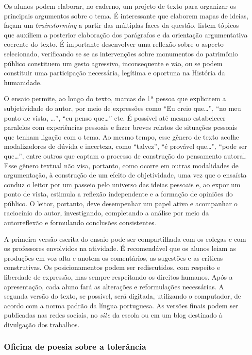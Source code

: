 \documentclass[11pt]{extarticle}
\begin{document}
Os alunos podem elaborar, no caderno, um projeto de texto para organizar
os principais argumentos sobre o tema. É interessante que elaborem mapas
de ideias, façam um \emph{brainstorming} a partir das múltiplas faces da
questão, listem tópicos que auxiliem a posterior elaboração dos
parágrafos e da orientação argumentativa coerente do texto. É importante
desenvolver uma reflexão sobre o aspecto selecionado, verificando se se
as intervenções sobre monumentos do patrimônio público constituem um
gesto agressivo, inconsequente e vão, ou se podem constituir uma
participação necessária, legítima e oportuna na História da humanidade.

O ensaio permite, ao longo do texto, marcas de 1ª pessoa que explicitem
a subjetividade do autor, por meio de expressões como ``Eu creio
que\ldots{}'', ``no meu ponto de vista, \ldots{}'', ``eu penso que\ldots{}'' etc. É
possível até mesmo estabelecer paralelos com experiências pessoais e
fazer breves relatos de situações pessoais que tenham ligação com o
tema. Ao mesmo tempo, esse gênero de texto acolhe modalizadores de
dúvida e incerteza, como ``talvez'', ``é provável que\ldots{}'', ``pode ser
que\ldots{}'', entre outros que captam o processo de construção do pensamento
autoral. Esse gênero textual não visa, portanto, como ocorre em outras
modalidades de argumentação, à construção de um efeito de objetividade,
uma vez que o ensaísta conduz o leitor por um passeio pelo universo das
ideias pessoais e, ao expor um ponto de vista, estimula a reflexão
independente e a formação de opiniões do público. O leitor, portanto,
deve desempenhar um papel ativo e acompanhar o raciocínio do autor,
investigando, completando a análise por meio da autorreflexão e
formulando conclusões consistentes.

A primeira versão escrita do ensaio pode ser compartilhada com os
colegas e com os professores envolvidos na atividade. É recomendável que
os alunos leiam as produções em voz alta e anotem os comentários, as
sugestões e as críticas construtivas. Os posicionamentos podem ser
rediscutidos, com respeito e liberdade de expressão, mas sempre
respeitando os direitos humanos. Após a apresentação, cada aluno fará as
alterações e reformulações necessárias. A segunda versão do texto, se possível, 
será digitada, utilizando o computador, de acordo com a norma padrão da
língua portuguesa. As versões finais podem ser publicadas nas redes
sociais, no \emph{site} da escola ou em um blog destinado à divulgação
dos trabalhos.

\subsubsection{Oficina de poesia sobre a tolerância}
\end{document}
